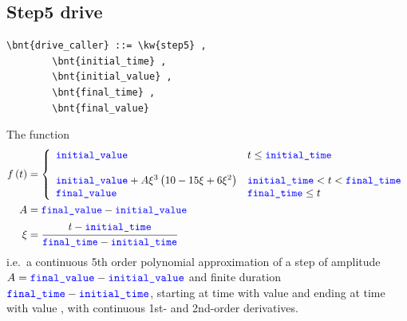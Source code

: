 \subsection{Step5 drive}
\begin{Verbatim}[commandchars=\\\{\}]
    \bnt{drive_caller} ::= \kw{step5} ,
        \bnt{initial_time} , 
        \bnt{initial_value} ,
        \bnt{final_time} ,
        \bnt{final_value}
\end{Verbatim}    
The function
\begin{align}
	f\plbr{t} &= 
	\lcubr{\matr{ll}{
		\nt{initial\_value} %
			& t \le \nt{initial\_time} \\
		\\
		\nt{initial\_value} + A \xi^3 \plbr{10 - 15 \xi + 6 \xi^2}
			& \nt{initial\_time} < t < \nt{final\_time}
		\\
		\nt{final\_value}
			& \nt{final\_time} \le t \\
	}}
	\\
	A &= \nt{final\_value} - \nt{initial\_value}
	\nonumber \\
	\xi &= \cfrac{t - \nt{initial\_time}}{\nt{final\_time} - \nt{initial\_time}}
	\nonumber 
\end{align}
i.e.\ a continuous 5th order polynomial approximation of a step of amplitude $A = \textcolor{blue}{\texttt{final\_value}} - \textcolor{blue}{\texttt{initial\_value}}$
and finite duration $\textcolor{blue}{\texttt{final\_time}} - \textcolor{blue}{\texttt{initial\_time}}$,
starting at time  with value  and ending at time  with value ,
with continuous 1st- and 2nd-order derivatives.

